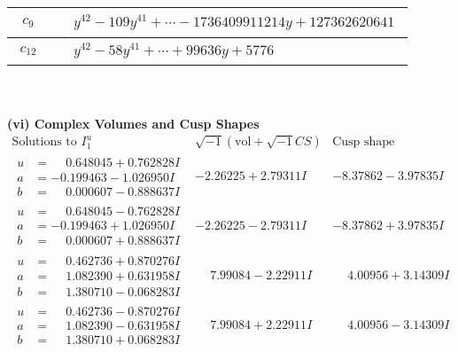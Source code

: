 \documentclass[1p]{elsarticle_modified}
\theoremstyle{definition}
\newcommand{\I}{\sqrt{-1}}
\begin{document}
\begin{tabular}{m{50pt}|m{274pt}}
\hline $$\begin{aligned}c_{9}\end{aligned}$$&$\begin{aligned}
&y^{42}-109 y^{41}+\cdots-1736409911214 y+127362620641
\end{aligned}$\\
\hline $$\begin{aligned}c_{12}\end{aligned}$$&$\begin{aligned}
&y^{42}-58 y^{41}+\cdots+99636 y+5776
\end{aligned}$\\
\hline
\end{tabular}\\~\\
\newpage\flushleft \textbf{(vi) Complex Volumes and Cusp Shapes}
$$\begin{array}{c|c|c}  
\text{Solutions to }I^u_{1}& \I (\text{vol} + \sqrt{-1}CS) & \text{Cusp shape}\\
 \hline 
\begin{aligned}
u &= \phantom{-}0.648045 + 0.762828 I \\
a &= -0.199463 - 1.026950 I \\
b &= \phantom{-}0.000607 - 0.888637 I\end{aligned}
 & -2.26225 + 2.79311 I & -8.37862 - 3.97835 I \\ \hline\begin{aligned}
u &= \phantom{-}0.648045 - 0.762828 I \\
a &= -0.199463 + 1.026950 I \\
b &= \phantom{-}0.000607 + 0.888637 I\end{aligned}
 & -2.26225 - 2.79311 I & -8.37862 + 3.97835 I \\ \hline\begin{aligned}
u &= \phantom{-}0.462736 + 0.870276 I \\
a &= \phantom{-}1.082390 + 0.631958 I \\
b &= \phantom{-}1.380710 - 0.068283 I\end{aligned}
 & \phantom{-}7.99084 - 2.22911 I & \phantom{-}4.00956 + 3.14309 I \\ \hline\begin{aligned}
u &= \phantom{-}0.462736 - 0.870276 I \\
a &= \phantom{-}1.082390 - 0.631958 I \\
b &= \phantom{-}1.380710 + 0.068283 I\end{aligned}
 & \phantom{-}7.99084 + 2.22911 I & \phantom{-}4.00956 - 3.14309 I \\ \hline\begin{aligned}

\end{aligned}
\end{array}$$
\end{document}
